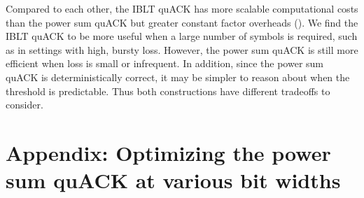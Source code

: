 Compared to each other, the IBLT quACK has more scalable computational costs
than the power sum quACK but greater constant factor overheads
(). We find the IBLT quACK to be more
useful when a large number of symbols is required, such as in settings with
high, bursty loss. However, the power sum quACK is still more efficient when
loss is small or infrequent. In addition, since the power sum quACK is
deterministically correct, it may be simpler to reason about when the threshold
is predictable. Thus both constructions have different tradeoffs to consider.

\section{Appendix: Optimizing the power sum quACK at various bit widths}
\label{sec:quack:appendix}


